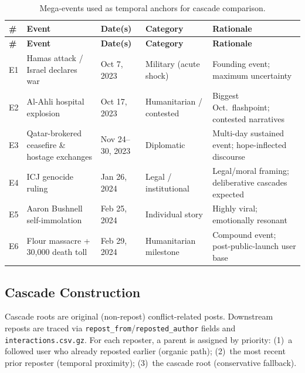 \documentclass[12pt,a4paper]{article}
\begin{document}
\begin{longtable}{
  @{}
  >{\centering\arraybackslash}p{0.5cm}
  >{\raggedright\arraybackslash}p{3.8cm}
  >{\centering\arraybackslash}p{2.5cm}
  >{\raggedright\arraybackslash}p{3.0cm}
  >{\raggedright\arraybackslash}p{4.0cm}
  @{}
}
\caption{Mega-events used as temporal anchors for cascade comparison.}
\label{tab:events} \\
\toprule
\textbf{\#} & \textbf{Event} & \textbf{Date(s)} & \textbf{Category} & \textbf{Rationale} \\
\midrule
\endfirsthead
\toprule
\textbf{\#} & \textbf{Event} & \textbf{Date(s)} & \textbf{Category} & \textbf{Rationale} \\
\midrule
\endhead
\bottomrule
\endlastfoot

E1 & Hamas attack / Israel declares war & Oct 7, 2023 & Military (acute shock) &
  Founding event; maximum uncertainty \\
\addlinespace
E2 & Al-Ahli hospital explosion & Oct 17, 2023 & Humanitarian / contested &
  Biggest Oct.\ flashpoint; contested narratives \\
\addlinespace
E3 & Qatar-brokered ceasefire \& hostage exchanges & Nov 24--30, 2023 &
  Diplomatic & Multi-day sustained event; hope-inflected discourse \\
\addlinespace
E4 & ICJ genocide ruling & Jan 26, 2024 & Legal / institutional &
  Legal/moral framing; deliberative cascades expected \\
\addlinespace
E5 & Aaron Bushnell self-immolation & Feb 25, 2024 & Individual story &
  Highly viral; emotionally resonant \\
\addlinespace
E6 & Flour massacre + 30{,}000 death toll & Feb 29, 2024 & Humanitarian milestone &
  Compound event; post-public-launch user base \\

\end{longtable}

\subsection{Cascade Construction}

Cascade roots are original (non-repost) conflict-related posts.  Downstream
reposts are traced via \texttt{repost\_from}/\texttt{reposted\_author} fields
and \texttt{interactions.csv.gz}.  For each reposter, a parent is assigned by
priority: (1)~a followed user who already reposted earlier (organic path);
(2)~the most recent prior reposter (temporal proximity); (3)~the cascade root
(conservative fallback).
\end{document}
